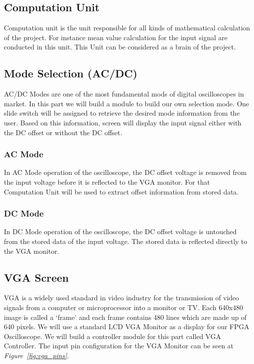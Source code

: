 \documentclass[paper]{IEEEtran}
\begin{document}
		
\subsection{Computation Unit} \- \indent
	Computation unit is the unit responsible for all kinds of mathematical calculation of the project. For instance mean value calculation for the input signal are conducted in this unit. This Unit can be considered as a brain of the project. 

\vfill

\subsection{Mode Selection (AC/DC)} \- \indent
	AC/DC Modes are one of the most fundamental mods of digital oscilloscopes in market. In this part we will build a module to build our own selection mode. One slide switch will be assigned to retrieve the desired mode information from the user. Based on this information, screen will display the input signal either with the DC offset or without the DC offset.

\subsubsection{AC Mode} \- \indent
	In AC Mode operation of the oscilloscope, the DC offset voltage is removed from the input voltage before it is reflected to the VGA monitor. For that Computation Unit will be used to extract offset information from stored data.

\subsubsection{DC Mode} \- \indent
	In DC Mode operation of the oscilloscope, the DC offset voltage is untouched from the stored data of the input voltage. The stored data is reflected directly to the VGA monitor. 
	

\subsection{VGA Screen} \- \indent
	VGA is a widely used standard in video industry for the transmission of video signals from a computer or microprocessor into a monitor or TV. Each 640x480 image is called a ‘frame’ and each frame contains 480 lines which are made up of 640 pixels. We will use a standard LCD VGA Monitor as a display for our FPGA Oscilloscope. We will build a controller module for this part called VGA Controller. The input pin configuration for the VGA Monitor can be seen at \textit{Figure~\ref{fig:vga_pins}}.
	
\end{document}
